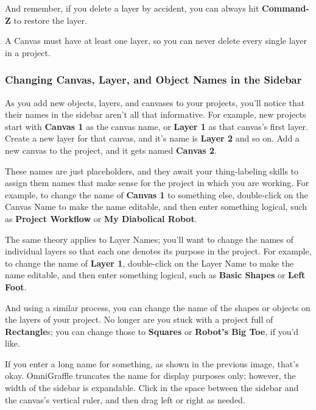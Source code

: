 \documentclass[../main.tex]{subfiles}
\begin{document}
And remember, if you delete a layer by accident, you can always hit \textbf{Command-Z} to
restore the layer.

\begin{ognote}
  A Canvas must have at least one layer, so you can never delete every single layer in a project.
\end{ognote}

\subsubsection{Changing Canvas, Layer, and Object Names in the Sidebar}

As you add new objects, layers, and canvases to your projects, you'll notice that their names in
the sidebar aren't all that informative. For example, new projects start with \textbf{Canvas
1} as the canvas name, or \textbf{Layer 1} as that canvas's first layer. Create a new layer
for that canvas, and it's name is \textbf{Layer 2} and so on. Add a new canvas to the project,
and it gets named \textbf{Canvas 2}.


These names are just placeholders, and they await your thing-labeling skills to assign them
names that make sense for the project in which you are working. For example, to change the
name of \textbf{Canvas 1} to something else, double-click on the Canvas Name to make the name
editable, and then enter something logical, such as \textbf{Project Workflow} or \textbf{My
Diabolical Robot}.


The same theory applies to Layer Names; you'll want to change the names of individual layers so
that each one denotes its purpose in the project. For example, to change the name of
\textbf{Layer 1}, double-click on the Layer Name to make the name editable, and then enter
something logical, such as \textbf{Basic Shapes} or \textbf{Left Foot}.


And using a similar process, you can change the name of the shapes or objects on the layers of
your project. No longer are you stuck with a project full of \textbf{Rectangle}s; you can
change those to \textbf{Squares} or \textbf{Robot's Big Toe}, if you'd like.


If you enter a long name for something, as shown in the previous image, that's okay. OmniGraffle
truncates the name for display purposes only; however, the width of the sidebar is expandable.
Click in the space between the sidebar and the canvas's vertical ruler, and then drag left or
right as needed.
\end{document}
